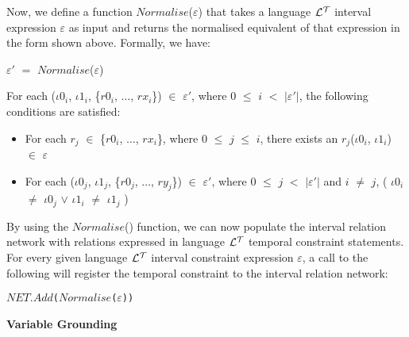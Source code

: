 \documentclass[11pt]{report}
\newenvironment{vverbatim}
{
  \begin{alltt}
}
{
  \vspace{-\baselineskip}
  \end{alltt}
}
\newenvironment{vquote}
{
  \begin{list}{}{\leftmargin 1em}\item[]
}
{
  \end{list}
}
\begin{document}
\begin{itemize}
              Now, we define a function $Normalise$($\varepsilon$) that takes
              a language ${\cal L^T}$ interval expression $\varepsilon$ as
              input and returns the normalised equivalent of that expression in
              the form shown above. Formally, we have:

              \begin{vquote}
                ${\varepsilon}'$ $=$ $Normalise$($\varepsilon$)
              \end{vquote}

              \noindent
              For each
              (${\iota}0_i$, ${\iota}1_i$, \{$r0_i$, $\ldots$, $rx_i$\})
              $\in$ ${\varepsilon}'$,
              where $0$ $\leq$ $i$ $<$ $|{\varepsilon}'|$, the following
              conditions are satisfied:

              \begin{itemize}
                \item
                  For each $r_j$ $\in$ \{$r0_i$, $\ldots$, $rx_i$\}, where $0$
                  $\leq$ $j$ $\leq$ $i$, there exists an
                  $r_j$(${\iota}0_i$, ${\iota}1_i$) $\in$ $\varepsilon$

                \item
                  For each 
                  (${\iota}0_j$, ${\iota}1_j$, \{$r0_j$, $\ldots$, $ry_j$\})
                  $\in$ ${\varepsilon}'$, where $0$ $\leq$ $j$ $<$
                  $|{\varepsilon}'|$ and $i$ $\neq$ $j$, 
                  (
                    ${\iota}0_i$ $\neq$ ${\iota}0_j$ $\lor$
                    ${\iota}1_i$ $\neq$ ${\iota}1_j$
                  )
              \end{itemize}

              By using the $Normalise$() function, we can now populate the
              interval relation network with relations expressed in
              language ${\cal L^T}$ temporal constraint statements. For every
              given language ${\cal L^T}$ interval constraint expression
              $\varepsilon$, a call to the following will register the
              temporal constraint to the interval relation network:

              \begin{vverbatim}
  \(NET.Add\)(\(Normalise\)(\(\varepsilon\)))
              \end{vverbatim}
              

            \item
              {\bf Variable Grounding}


\end{itemize}
\end{document}
